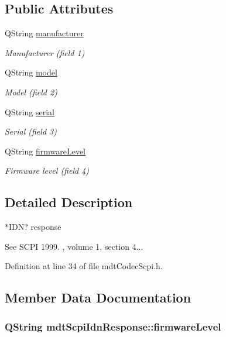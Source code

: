 \subsection*{Public Attributes}
\begin{DoxyCompactItemize}
\item 
Q\-String \hyperlink{structmdt_scpi_idn_response_a0717970554dda1af9280da1631a3780c}{manufacturer}
\begin{DoxyCompactList}\small\item\em Manufacturer (field 1) \end{DoxyCompactList}\item 
Q\-String \hyperlink{structmdt_scpi_idn_response_a74342b6921035df5c97bebce6d3da4f8}{model}
\begin{DoxyCompactList}\small\item\em Model (field 2) \end{DoxyCompactList}\item 
Q\-String \hyperlink{structmdt_scpi_idn_response_a56f1955c1e339298793d0292f0f0a06c}{serial}
\begin{DoxyCompactList}\small\item\em Serial (field 3) \end{DoxyCompactList}\item 
Q\-String \hyperlink{structmdt_scpi_idn_response_a76e5911166e3462080455bdc1bfe66c8}{firmware\-Level}
\begin{DoxyCompactList}\small\item\em Firmware level (field 4) \end{DoxyCompactList}\end{DoxyCompactItemize}


\subsection{Detailed Description}
$\ast$\-I\-D\-N? response 

See S\-C\-P\-I 1999. , volume 1, section 4... 

Definition at line 34 of file mdt\-Codec\-Scpi.\-h.



\subsection{Member Data Documentation}
\hypertarget{structmdt_scpi_idn_response_a76e5911166e3462080455bdc1bfe66c8}{
\subsubsection[{firmware\-Level}]{\setlength{\rightskip}{0pt plus 5cm}Q\-String mdt\-Scpi\-Idn\-Response\-::firmware\-Level}}\label{structmdt_scpi_idn_response_a76e5911166e3462080455bdc1bfe66c8}


